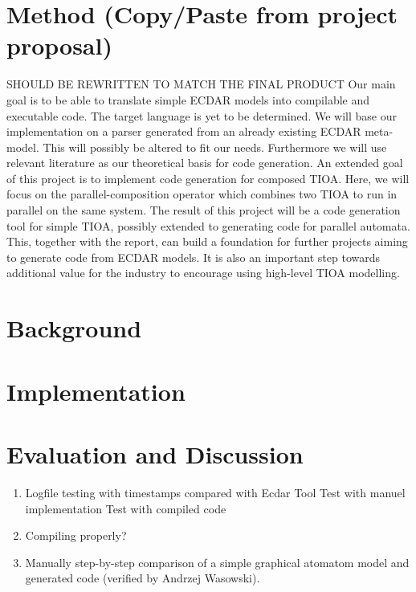\documentclass{llncs}
\begin{document}
\section{Method (Copy/Paste from project proposal)}
%
SHOULD BE REWRITTEN TO MATCH THE FINAL PRODUCT
\newline
Our main goal is to be able to translate simple ECDAR models into compilable and executable code. The target language is yet to be determined. We will base our implementation on a parser generated from an already existing ECDAR meta-model. This will possibly be altered to fit our needs. Furthermore we will use relevant literature as our theoretical basis for code generation. 
\newline
An extended goal of this project is to implement code generation for composed TIOA. Here, we will focus on the parallel-composition operator which combines two TIOA to run in parallel on the same system. 
\newline
The result of this project will be a code generation tool for simple TIOA, possibly extended to generating code for parallel automata. This, together with the report, can build a foundation for further projects aiming to generate code from ECDAR models. It is also an important step towards additional value for the industry to encourage using high-level TIOA modelling.
%


\section{Background\label{background}}






\section{Implementation\label{implementation}}



\section{Evaluation and Discussion}
\begin{enumerate}
\item Logfile testing with timestamps compared with Ecdar Tool
    \subitem Test with manuel implementation
    \subitem Test with compiled code
\item Compiling properly?
\item Manually step-by-step comparison of a simple graphical atomatom model and generated code (verified by Andrzej Wasowski).
\end{enumerate}
\end{document}
